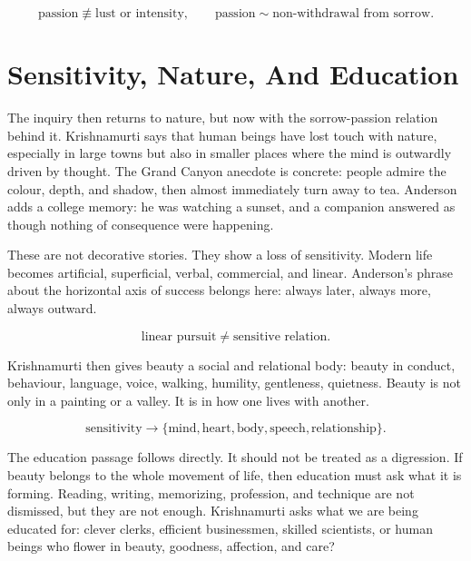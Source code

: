 \documentclass[11pt,oneside]{book}
\begin{document}
\begin{equation}
\text{passion}
\not\equiv
\text{lust or intensity},
\qquad
\text{passion}
\sim
\text{non-withdrawal from sorrow}.
\end{equation}

\section{Sensitivity, Nature, And Education}

The inquiry then returns to nature, but now with the sorrow-passion relation behind it. Krishnamurti says that human beings have lost touch with nature, especially in large towns but also in smaller places where the mind is outwardly driven by thought. The Grand Canyon anecdote is concrete: people admire the colour, depth, and shadow, then almost immediately turn away to tea. Anderson adds a college memory: he was watching a sunset, and a companion answered as though nothing of consequence were happening.

These are not decorative stories. They show a loss of sensitivity. Modern life becomes artificial, superficial, verbal, commercial, and linear. Anderson's phrase about the horizontal axis of success belongs here: always later, always more, always outward.

\begin{equation}
\text{linear pursuit}
\neq
\text{sensitive relation}.
\end{equation}

Krishnamurti then gives beauty a social and relational body: beauty in conduct, behaviour, language, voice, walking, humility, gentleness, quietness. Beauty is not only in a painting or a valley. It is in how one lives with another.

\begin{equation}
\text{sensitivity}
\longrightarrow
\{\text{mind},\text{heart},\text{body},\text{speech},\text{relationship}\}.
\end{equation}

The education passage follows directly. It should not be treated as a digression. If beauty belongs to the whole movement of life, then education must ask what it is forming. Reading, writing, memorizing, profession, and technique are not dismissed, but they are not enough. Krishnamurti asks what we are being educated for: clever clerks, efficient businessmen, skilled scientists, or human beings who flower in beauty, goodness, affection, and care?
\end{document}
